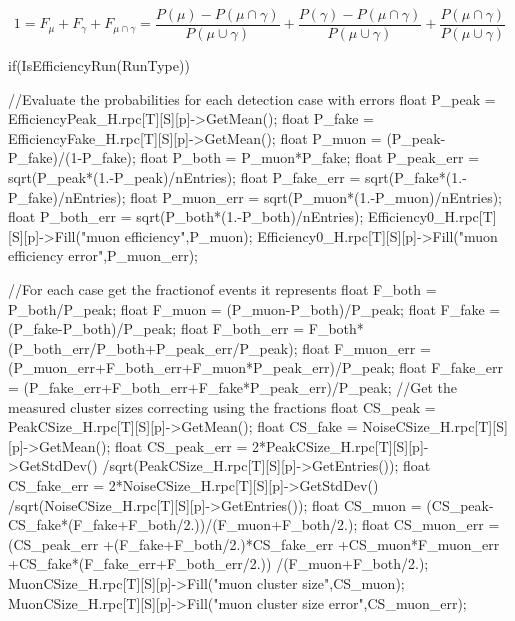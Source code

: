 	\begin{equation}
	\label{eq:fractions}
	1 = F_{\mu} + F_{\gamma} + F_{\mu\cap\gamma} = \frac{P(\mu)-P(\mu\cap\gamma)}{P(\mu\cup\gamma)} + \frac{P(\gamma)-P(\mu\cap\gamma)}{P(\mu\cup\gamma)} + \frac{P(\mu\cap\gamma)}{P(\mu\cup\gamma)}
	\end{equation}
	
	\begin{code}
	\begin{cppcode}
if(IsEfficiencyRun(RunType)){
    //Evaluate the probabilities for each detection case with errors
    float P_peak = EfficiencyPeak_H.rpc[T][S][p]->GetMean();
    float P_fake = EfficiencyFake_H.rpc[T][S][p]->GetMean();
    float P_muon = (P_peak-P_fake)/(1-P_fake);
    float P_both = P_muon*P_fake;
    float P_peak_err = sqrt(P_peak*(1.-P_peak)/nEntries);
    float P_fake_err = sqrt(P_fake*(1.-P_fake)/nEntries);
    float P_muon_err = sqrt(P_muon*(1.-P_muon)/nEntries);
    float P_both_err = sqrt(P_both*(1.-P_both)/nEntries);
    Efficiency0_H.rpc[T][S][p]->Fill("muon efficiency",P_muon);
    Efficiency0_H.rpc[T][S][p]->Fill("muon efficiency error",P_muon_err);

    //For each case get the fractionof events it represents
    float F_both = P_both/P_peak;
    float F_muon = (P_muon-P_both)/P_peak;
    float F_fake = (P_fake-P_both)/P_peak;
    float F_both_err = F_both*(P_both_err/P_both+P_peak_err/P_peak);
    float F_muon_err = (P_muon_err+F_both_err+F_muon*P_peak_err)/P_peak;
    float F_fake_err = (P_fake_err+F_both_err+F_fake*P_peak_err)/P_peak;
    //Get the measured cluster sizes correcting using the fractions
    float CS_peak = PeakCSize_H.rpc[T][S][p]->GetMean();
    float CS_fake = NoiseCSize_H.rpc[T][S][p]->GetMean();
    float CS_peak_err = 2*PeakCSize_H.rpc[T][S][p]->GetStdDev()
                        /sqrt(PeakCSize_H.rpc[T][S][p]->GetEntries());
    float CS_fake_err = 2*NoiseCSize_H.rpc[T][S][p]->GetStdDev()
                        /sqrt(NoiseCSize_H.rpc[T][S][p]->GetEntries());
    float CS_muon = (CS_peak-CS_fake*(F_fake+F_both/2.))/(F_muon+F_both/2.);
    float CS_muon_err = (CS_peak_err
                         +(F_fake+F_both/2.)*CS_fake_err
                         +CS_muon*F_muon_err
                         +CS_fake*(F_fake_err+F_both_err/2.))
                        /(F_muon+F_both/2.);
    MuonCSize_H.rpc[T][S][p]->Fill("muon cluster size",CS_muon);
    MuonCSize_H.rpc[T][S][p]->Fill("muon cluster size error",CS_muon_err);

}
\end{cppcode}
\end{code}
